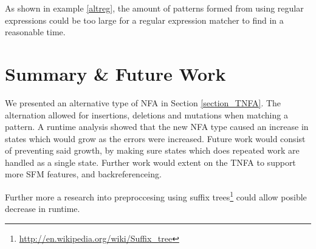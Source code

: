 As shown in example \ref{altreg}, the amount of patterns formed from using regular expressions could be too large for a regular expression matcher to find in a reasonable time. 

\section{Summary \& Future Work}
We presented an alternative type of NFA in Section \ref{section_TNFA}.
The alternation allowed for insertions, deletions and mutations when matching a pattern.
A runtime analysis showed that the new NFA type caused an increase in states which would grow as the errors were increased.
Future work would consist of preventing said growth, by making sure states which does repeated work are handled as a single state. 
Further work would extent on the TNFA to support more SFM features, and backreferenceing. 

Further more a research into preproccesing using suffix trees\footnote{\url{http://en.wikipedia.org/wiki/Suffix_tree}} could allow posible decrease in runtime.
